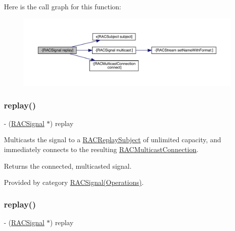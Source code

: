 Here is the call graph for this function\+:\nopagebreak
\begin{figure}[H]
\begin{center}
\leavevmode
\includegraphics[width=350pt]{interface_r_a_c_signal_a6d7d83297f6b837dd5efc18c38483a94_cgraph}
\end{center}
\end{figure}
\mbox{\label{interface_r_a_c_signal_a6d7d83297f6b837dd5efc18c38483a94}} 
\subsubsection{\texorpdfstring{replay()}{replay()}\hspace{0.1cm}{\footnotesize\ttfamily [2/3]}}
{\footnotesize\ttfamily -\/ (\mbox{\hyperlink{interface_r_a_c_signal}{R\+A\+C\+Signal}} $\ast$) replay \begin{DoxyParamCaption}{ }\end{DoxyParamCaption}}

Multicasts the signal to a \mbox{\hyperlink{interface_r_a_c_replay_subject}{R\+A\+C\+Replay\+Subject}} of unlimited capacity, and immediately connects to the resulting \mbox{\hyperlink{interface_r_a_c_multicast_connection}{R\+A\+C\+Multicast\+Connection}}.

Returns the connected, multicasted signal. 

Provided by category \mbox{\hyperlink{category_r_a_c_signal_07_operations_08_a6d7d83297f6b837dd5efc18c38483a94}{R\+A\+C\+Signal(\+Operations)}}.

\mbox{\label{interface_r_a_c_signal_a6d7d83297f6b837dd5efc18c38483a94}} 
\subsubsection{\texorpdfstring{replay()}{replay()}\hspace{0.1cm}{\footnotesize\ttfamily [3/3]}}
{\footnotesize\ttfamily -\/ (\mbox{\hyperlink{interface_r_a_c_signal}{R\+A\+C\+Signal}} $\ast$) replay \begin{DoxyParamCaption}{ }\end{DoxyParamCaption}}

